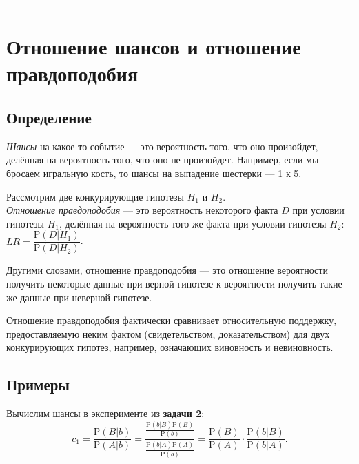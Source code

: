 \documentclass[11pt,a4paper]{article}
\begin{document}
    \begin{center}\rule{0.5\linewidth}{0.5pt}\end{center}

    \hypertarget{ux43eux442ux43dux43eux448ux435ux43dux438ux435-ux448ux430ux43dux441ux43eux432-ux43eux442ux43dux43eux448ux435ux43dux438ux435-ux43fux440ux430ux432ux434ux43eux43fux43eux434ux43eux431ux438ux44f}{%
\section{Отношение шансов и отношение
правдоподобия}\label{ux43eux442ux43dux43eux448ux435ux43dux438ux435-ux448ux430ux43dux441ux43eux432-ux43eux442ux43dux43eux448ux435ux43dux438ux435-ux43fux440ux430ux432ux434ux43eux43fux43eux434ux43eux431ux438ux44f}}

    \hypertarget{ux43eux43fux440ux435ux434ux435ux43bux435ux43dux438ux435}{%
\subsection{Определение}\label{ux43eux43fux440ux435ux434ux435ux43bux435ux43dux438ux435}}
\emph{Шансы} на какое-то событие --- это вероятность того, что оно
произойдет, делённая на вероятность того, что оно не произойдет.
Например, если мы бросаем игральную кость, то шансы на выпадение
шестерки --- 1 к 5.

Рассмотрим две конкурирующие гипотезы \(H_1\) и \(H_2\).\\
\emph{Отношение правдоподобия} --- это вероятность некоторого факта
\(D\) при условии гипотезы \(H_1\), делённая на вероятность того же
факта при условии гипотезы \(H_2\):
\(LR = \dfrac{\mathrm{P}(D|H_1)}{\mathrm{P}(D|H_2)}\).

Другими словами, отношение правдоподобия --- это отношение вероятности
получить некоторые данные при верной гипотезе к вероятности получить
такие же данные при неверной гипотезе.

Отношение правдоподобия фактически сравнивает относительную поддержку,
предоставляемую неким фактом (свидетельством, доказательством) для двух
конкурирующих гипотез, например, означающих виновность и невиновность.

    \hypertarget{ux43fux440ux438ux43cux435ux440ux44b}{%
\subsection{Примеры}\label{ux43fux440ux438ux43cux435ux440ux44b}}

Вычислим шансы в эксперименте из \textbf{задачи 2}: \[
  c_1 = \dfrac{\mathrm{P}(B|b)}{\mathrm{P}(A|b)} = \dfrac{\frac{\mathrm{P}(b|B)\mathrm{P}(B)}{\mathrm{P}(b)}} {\frac{\mathrm{P}(b|A)\mathrm{P}(A)}{\mathrm{P}(b)}} = \frac{\mathrm{P}(B)}{\mathrm{P}(A)} \cdot \dfrac{\mathrm{P}(b|B)}{\mathrm{P}(b|A)}. \tag{3}\label{eq:chances}
\]
\end{document}

